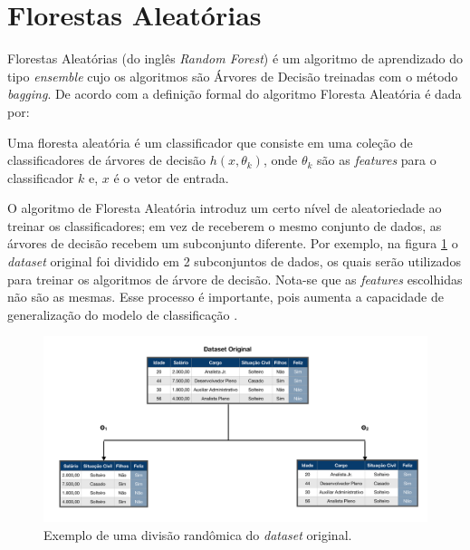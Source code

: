 \section{Florestas Aleatórias}
\label{sec:floresta}

Florestas Aleatórias (do inglês \textit{Random Forest}) é um algoritmo de aprendizado do tipo \textit{ensemble} cujo os algoritmos são Árvores de Decisão \cite{Quinlan:1986} treinadas com o método \textit{bagging}.
De acordo com \cite{breiman:2001} a definição formal do algoritmo Floresta Aleatória é dada por:

\begin{definition}\label{def:floresta}
Uma floresta aleatória é um classificador que consiste em uma coleção de classificadores de árvores de decisão ${h(x, \theta _k)}$, onde ${\theta _k}$ são as \textit{features} para o classificador $k$ e, $x$ é o vetor de entrada.
\end{definition}

O algoritmo de Floresta Aleatória introduz um certo nível de aleatoriedade ao treinar os classificadores; em vez de receberem o mesmo conjunto de dados, as árvores de decisão recebem um subconjunto diferente. Por exemplo, na figura \ref{fig:split_floresta} o \textit{dataset} original foi dividido em 2 subconjuntos de dados, os quais serão utilizados para treinar os algoritmos de árvore de decisão. Nota-se que as \textit{features} escolhidas não são as mesmas. Esse processo é importante, pois aumenta a capacidade de generalização do modelo de classificação \cite{breiman:2001}.

\begin{figure}[h!]
    \centering
    \includegraphics[scale=0.4]{Imagens/split_RandomForest.png}
    \caption{Exemplo de uma divisão randômica do \textit{dataset} original.}
    \label{fig:split_floresta}
\end{figure}

